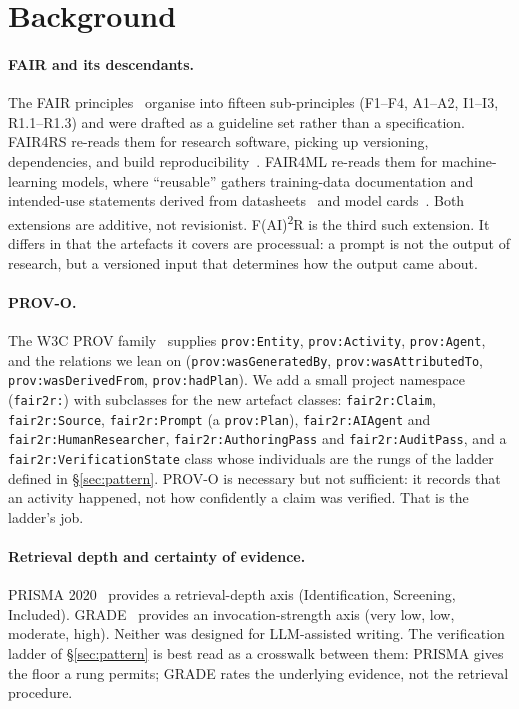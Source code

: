 \section{Background}
\label{sec:background}

\paragraph{FAIR and its descendants.}
The FAIR principles~\cite{wilkinson2016fair} organise into fifteen
sub-principles (F1--F4, A1--A2, I1--I3, R1.1--R1.3) and were drafted
as a guideline set rather than a specification. FAIR4RS re-reads them
for research software, picking up versioning, dependencies, and
build reproducibility~\cite{chuehong2022fair4rs}.
FAIR4ML re-reads them for machine-learning models, where ``reusable''
gathers training-data documentation and intended-use statements
derived from datasheets~\cite{gebru2021datasheets} and model
cards~\cite{mitchell2019modelcards,ravi2024fair4ml}. Both extensions
are additive, not revisionist.
F(AI)\textsuperscript{2}R is the third such extension. It differs in
that the artefacts it covers are processual: a prompt is not the
output of research, but a versioned input that determines how the
output came about.

\paragraph{PROV-O.}
The W3C PROV family~\cite{w3c2013provo} supplies
\texttt{prov:Entity}, \texttt{prov:Activity}, \texttt{prov:Agent}, and
the relations we lean on (\texttt{prov:wasGeneratedBy},
\texttt{prov:wasAttributedTo}, \texttt{prov:wasDerivedFrom},
\texttt{prov:hadPlan}). We add a small project namespace
(\texttt{fair2r:}) with subclasses for the new artefact classes:
\texttt{fair2r:Claim}, \texttt{fair2r:Source}, \texttt{fair2r:Prompt}
(a \texttt{prov:Plan}), \texttt{fair2r:AIAgent} and
\texttt{fair2r:HumanResearcher}, \texttt{fair2r:AuthoringPass} and
\texttt{fair2r:AuditPass}, and a \texttt{fair2r:VerificationState}
class whose individuals are the rungs of the ladder defined in
\S\ref{sec:pattern}. PROV-O is necessary but not sufficient: it
records that an activity happened, not how confidently a claim was
verified. That is the ladder's job.

\paragraph{Retrieval depth and certainty of evidence.}
PRISMA 2020~\cite{page2021prisma} provides a retrieval-depth axis
(Identification, Screening, Included). GRADE~\cite{guyatt2008grade}
provides an invocation-strength axis (very low, low, moderate, high).
Neither was designed for LLM-assisted writing. The verification
ladder of \S\ref{sec:pattern} is best read as a crosswalk between
them: PRISMA gives the floor a rung permits; GRADE rates the
underlying evidence, not the retrieval procedure.

